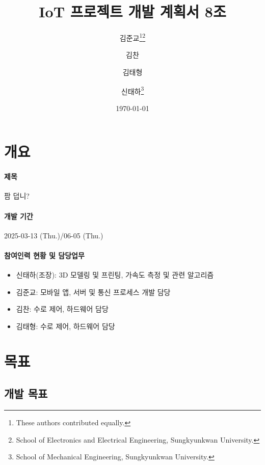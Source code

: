 \documentclass[12pt]{article}
\title{IoT 프로젝트 개발 계획서 8조}
\author{
    \vspace{-5mm}
    김준교\thanks{These authors contributed equally.}\protect\phantom{\footnotesize 1}\thanks{School of Electronics and Electrical Engineering, Sungkyunkwan University.} \and
    김찬\footnotemark[1]\protect\phantom{\footnotesize 1}\footnotemark[2] \and 김태형\footnotemark[1]\protect\phantom{\footnotesize 1}\footnotemark[2] \and
    신태하\footnotemark[1]\protect\phantom{\footnotesize 1}\thanks{School of Mechanical Engineering, Sungkyunkwan University.}
    \vspace{-5mm}
}
\date{\today}
\begin{document}
    \maketitle
    \thispagestyle{empty}
    \vspace{-10mm}
    \section{개요}
            \paragraph{{\textbf{제목}}} 팜 덥니?
            \paragraph{\textbf{개발 기간}} 2025-03-13 (Thu.)/06-05 (Thu.)
            \paragraph{\textbf{참여인력 현황 및 담당업무}}
            \begin{itemize}
                \item 신태하(조장): 3D 모델링 및 프린팅, 가속도 측정 및 관련 알고리즘
                \item 김준교: 모바일 앱, 서버 및 통신 프로세스 개발 담당
                \item 김찬: 수로 제어, 하드웨어 담당
                \item 김태형: 수로 제어, 하드웨어 담당
            \end{itemize}
    \section{목표}
        \subsection{개발 목표}
\end{document}
